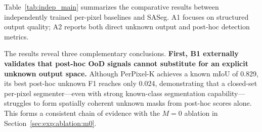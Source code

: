 \documentclass[3p,twocolumn,authoryear]{elsarticle}
\begin{document}
Table~\ref{tab:indep_main} summarizes the comparative results between independently
trained per-pixel baselines and SASeg.
A1 focuses on structured output quality; A2 reports both direct unknown output and
post-hoc detection metrics.

\begin{table}[!t]
\centering
\footnotesize
\setlength{\tabcolsep}{4pt}
\caption{Summary of independent architecture baseline results on Synapse (single run, seed=42).
`direct' denotes the model's direct unknown class mask output;
`post-hoc' denotes detection signals applied additionally on top of a closed-set or
$K+1$ segmenter; `\texttt{---}' indicates the metric is not applicable or not reported
for that protocol/setting.}\label{tab:indep_main}
\end{table}

The results reveal three complementary conclusions.
\textbf{First, B1 externally validates that post-hoc OoD signals cannot substitute for
an explicit unknown output space.}
Although PerPixel-K achieves a known mIoU of 0.829, its best post-hoc unknown F1
reaches only 0.024, demonstrating that a closed-set per-pixel segmenter---even with
strong known-class segmentation capability---struggles to form spatially coherent
unknown masks from post-hoc scores alone.
This forms a consistent chain of evidence with the $M=0$ ablation in
Section~\ref{sec:exp:ablation:m0}.
\end{document}
